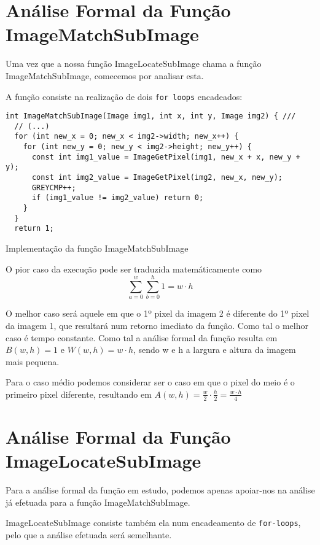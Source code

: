 \section{Análise Formal da Função ImageMatchSubImage}
\renewcommand{\listingscaption}{Código:}
Uma vez que a nossa função ImageLocateSubImage chama a
função ImageMatchSubImage, comecemos por analisar esta.

A função consiste na realização de dois \verb|for loops|
encadeados:
\begin{listing}[H]
	\centering
	\begin{verbatim}
int ImageMatchSubImage(Image img1, int x, int y, Image img2) { ///
  // (...)
  for (int new_x = 0; new_x < img2->width; new_x++) {
    for (int new_y = 0; new_y < img2->height; new_y++) {
      const int img1_value = ImageGetPixel(img1, new_x + x, new_y + y);
      const int img2_value = ImageGetPixel(img2, new_x, new_y);
      GREYCMP++;
      if (img1_value != img2_value) return 0;
    }
  }
  return 1;
\end{verbatim}
	\caption{Implementação da função ImageMatchSubImage}
\end{listing}

O pior caso da execução pode ser traduzida matemáticamente como
\begin{equation}
	\sum_{a=0}^{w}\sum_{b=0}^{h}1 = w \cdot h
\end{equation}

O melhor caso será aquele em que o 1º pixel da imagem
2 é diferente do 1º pixel da imagem 1, que resultará num
retorno imediato da função. Como tal o melhor caso é tempo
constante.
Como tal a análise formal da função resulta em $B(w,h) = 1$
e $W(w,h) = w \cdot h$, sendo w e h a largura e altura da
imagem mais pequena.

Para o caso médio podemos considerar ser o caso em que o
pixel do meio é o primeiro pixel diferente, resultando em
$A(w,h) = \frac{w}{2} \cdot \frac{h}{2} = \frac{w \cdot h}{4} $

\section{Análise Formal da Função ImageLocateSubImage}

Para a análise formal da função em estudo, podemos apenas
apoiar-nos na análise já efetuada para a função
ImageMatchSubImage.

ImageLocateSubImage consiste também ela num encadeamento de
\verb|for-loops|, pelo que a análise efetuada será
semelhante.

